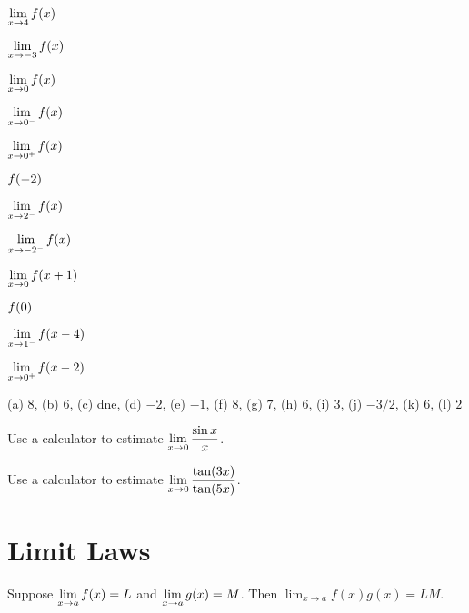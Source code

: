 \begin{exercises}
\begin{exercise}
\begin{enumerate}
\begin{multicols}{3}
\item $\displaystyle \lim_{x\to 4} f(x)$  
\item $\displaystyle \lim_{x\to -3} f(x)$  
\item $\displaystyle \lim_{x\to 0} f(x)$ 
\item $\displaystyle \lim_{x\to 0^-} f(x)$  
\item $\displaystyle \lim_{x\to 0^+} f(x)$  
\item $\displaystyle f(-2)$  
\item $\displaystyle \lim_{x\to 2^-} f(x)$  
\item $\displaystyle \lim_{x\to -2^-} f(x)$  
\item $\displaystyle \lim_{x\to 0} f(x+1)$  
\item $\displaystyle f(0)$ 
\item $\displaystyle \lim_{x\to 1^-} f(x-4)$  
\item $\displaystyle \lim_{x\to 0^+} f(x-2)$
\end{multicols}  
\end{enumerate}
\begin{answer} (a) $8$, (b) $6$, (c) dne, (d) $-2$, (e) $-1$, (f) $8$,
 (g) $7$, (h) $6$, (i) $3$, (j) $-3/2$, (k) $6$, (l) $2$
\end{answer}
\end{exercise}

\begin{exercise} Use a calculator to estimate $\displaystyle\lim_{x\to 0}
{\sin x\over x}$.
\end{exercise}

\begin{exercise} Use a calculator to estimate $\displaystyle\lim_{x\to 0}
{\tan(3x)\over\tan(5x)}$.
\end{exercise}
\end{exercises}






\section{Limit Laws}

\begin{theorem} 
Suppose $\displaystyle \lim_{x\to a} f(x)=L$ and $\displaystyle \lim_{x\to a}g(x)=M$. Then
$\lim_{x\to a} f(x)g(x) = LM$.
\end{theorem}

